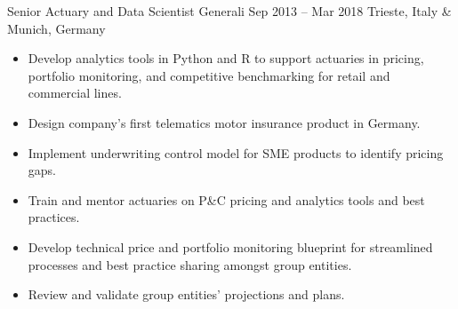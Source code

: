 \documentclass[a4paper,]{fortysecondscv}
\begin{document}
\begin{cvtable}
{\begin{itemize}[nosep, leftmargin=12pt , label={-}]
        \end{itemize}
    }
    \vspace{\topsep}
    \cvitemoneblock
    {Senior Actuary and Data Scientist}
    {Generali}
    {Sep 2013 -- Mar 2018}
    {Trieste, Italy \& Munich, Germany}
    {
        \begin{itemize}[nosep, leftmargin=12pt , label={-}] %
            \item Develop analytics tools in Python and R to support actuaries in pricing, portfolio monitoring, and competitive benchmarking for retail and commercial lines.
            \item Design company's first telematics motor insurance product in Germany.
            \item Implement underwriting control model for SME products to identify pricing gaps.
            \item Train and mentor actuaries on P\&C pricing and analytics tools and best practices.
            \item Develop technical price and portfolio monitoring blueprint for streamlined processes and best practice sharing amongst group entities.
            \item Review and validate group entities' projections and plans.
        \end{itemize}
    }

\end{cvtable}
\end{document}
